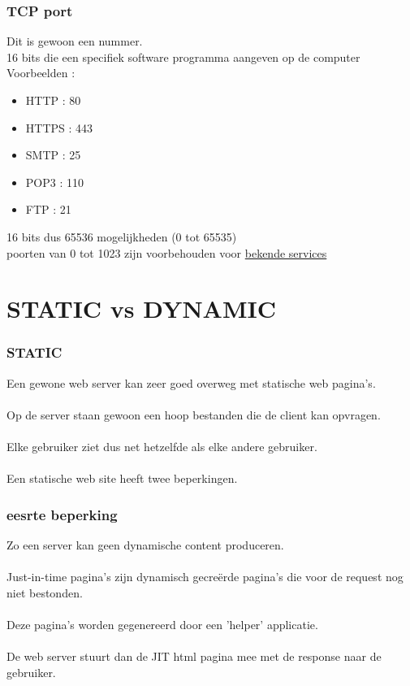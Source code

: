 \documentclass{beamer}
\begin{document}
\begin{frame}

\frametitle{TCP port}

{\Large Dit is gewoon een nummer.\\

16 bits die een specifiek software programma aangeven op de computer\\

Voorbeelden :

\begin{itemize}
  \item HTTP : 80
  \item HTTPS : 443
  \item SMTP : 25
  \item POP3 : 110
  \item FTP : 21
\end{itemize}}

16 bits dus 65536 mogelijkheden (0 tot 65535)\\
poorten van 0 tot 1023 zijn voorbehouden voor \href{https://en.wikipedia.org/wiki/List_of_TCP_and_UDP_port_numbers\#Well-known_ports}{bekende services}

\end{frame}

\section{STATIC vs DYNAMIC}


\begin{frame}

\frametitle{STATIC}

{\Large Een gewone web server kan zeer goed overweg met statische web pagina's.\\~\\
Op de server staan gewoon een hoop bestanden die de client kan opvragen.\\~\\
Elke gebruiker ziet dus net hetzelfde als elke andere gebruiker.\\~\\
Een statische web site heeft twee beperkingen.}

\end{frame}


\begin{frame}

\frametitle{eesrte beperking}

{\Large Zo een server kan geen dynamische content produceren.\\~\\
Just-in-time pagina's zijn dynamisch gecre\"erde pagina's die
voor de request nog niet bestonden.\\~\\Deze pagina's worden gegenereerd
door een 'helper' applicatie.\\~\\ De web server stuurt dan de JIT html pagina
mee met de response naar de gebruiker.}

\end{frame}
\end{document}
